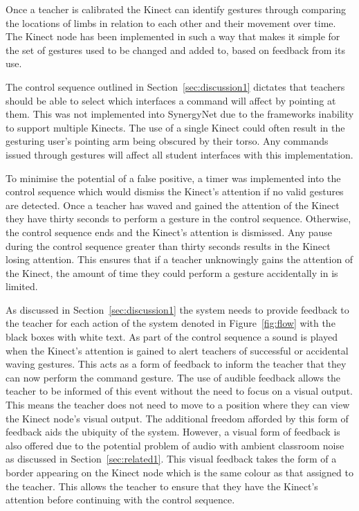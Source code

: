 \documentclass[manuscript, review, screen]{acmart}
\begin{document}
Once a teacher is calibrated the Kinect can identify gestures through comparing the locations of limbs in relation to each other and their movement over time.
The Kinect node has been implemented in such a way that makes it simple for the set of gestures used to be changed and added to, based on feedback from its use.

The control sequence outlined in Section~\ref{sec:discussion1} dictates that teachers should be able to select which interfaces a command will affect by pointing at them.
This was not implemented into SynergyNet due to the frameworks inability to support multiple Kinects.
The use of a single Kinect could often result in the gesturing user's pointing arm being obscured by their torso.
Any commands issued through gestures will affect all student interfaces with this implementation.

To minimise the potential of a false positive, a timer was implemented into the control sequence which would dismiss the Kinect's attention if no valid gestures are detected.
Once a teacher has waved and gained the attention of the Kinect they have thirty seconds to perform a gesture in the control sequence.
Otherwise, the control sequence ends and the Kinect's attention is dismissed.
Any pause during the control sequence greater than thirty seconds results in the Kinect losing attention.
This ensures that if a teacher unknowingly gains the attention of the Kinect, the amount of time they could perform a gesture accidentally in is limited.

As discussed in Section~\ref{sec:discussion1} the system needs to provide feedback to the teacher for each action of the system denoted in Figure~\ref{fig:flow} with the black boxes with white text.
As part of the control sequence a sound is played when the Kinect's attention is gained to alert teachers of successful or accidental waving gestures.
This acts as a form of feedback to inform the teacher that they can now perform the command gesture.
The use of audible feedback allows the teacher to be informed of this event without the need to focus on a visual output.
This means the teacher does not need to move to a position where they can view the Kinect node's visual output.
The additional freedom afforded by this form of feedback aids the ubiquity of the system.
However, a visual form of feedback is also offered due to the potential problem of audio with ambient classroom noise as discussed in Section~\ref{sec:related1}.
This visual feedback takes the form of a border appearing on the Kinect node which is the same colour as that assigned to the teacher.
This allows the teacher to ensure that they have the Kinect's attention before continuing with the control sequence.
\end{document}
